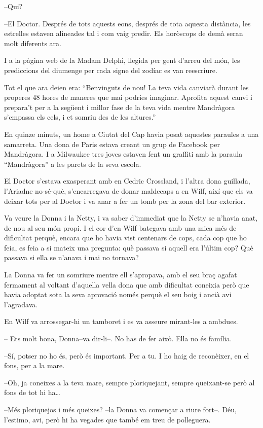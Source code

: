 --Qui?

--El Doctor. Després de tots aquests eons, després de tota aquesta
distància, les estrelles estaven alineades tal i com vaig predir. Els
horòscops de demà seran molt diferents ara.

I a la pàgina web de la Madam Delphi, llegida per gent d'arreu del món,
les prediccions del diumenge per cada signe del zodíac es van
reescriure.

Tot el que ara deien era: ``Benvinguts de nou! La teva vida canviarà
durant les properes 48 hores de maneres que mai podries imaginar.
Aprofita aquest canvi i prepara't per a la següent i millor fase de la
teva vida mentre Mandràgora s'empassa els cels, i et somriu des de les
altures.''

En quinze minuts, un home a Ciutat del Cap havia posat aquestes paraules
a una samarreta. Una dona de Paris estava creant un grup de Facebook per
Mandràgora. I a Milwaukee tres joves estaven fent un graffiti amb la
paraula ``Mandràgora'' a les parets de la seva escola.

El Doctor s'estava exasperant amb en Cedric Crossland, i l'altra dona
guillada, l'Ariadne no-sé-què, s'encarregava de donar maldecaps a en
Wilf, així que els va deixar tots per al Doctor i va anar a fer un tomb
per la zona del bar exterior.

Va veure la Donna i la Netty, i va saber d'immediat que la Netty se
n'havia anat, de nou al seu món propi. I el cor d'en Wilf bategava amb
una mica més de dificultat perquè, encara que ho havia vist centenars de
cops, cada cop que ho feia, es feia a si mateix una pregunta: què
passava si aquell era l'últim cop? Què passava si ella se n'anava i mai
no tornava?

La Donna va fer un somriure mentre ell s'apropava, amb el seu braç
agafat fermament al voltant d'aquella vella dona que amb dificultat
coneixia però que havia adoptat sota la seva aprovació només perquè el
seu boig i ancià avi l'agradava.

En Wilf va arrossegar-hi un tamboret i es va asseure mirant-les a
ambdues.

-- Ets molt bona, Donna--va dir-li--. No has de fer això. Ella no és
família.

--Sí, potser no ho és, però és important. Per a tu. I ho haig de
reconèixer, en el fons, per a la mare.

--Oh, ja coneixes a la teva mare, sempre ploriquejant, sempre
queixant-se però al fons de tot hi ha\ldots{}

--Més ploriquejos i més queixes? --la Donna va començar a riure fort--.
Déu, l'estimo, avi, però hi ha vegades que també em treu de polleguera.

